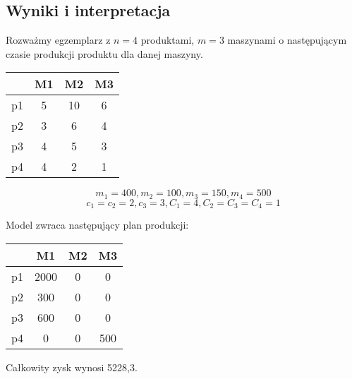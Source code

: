 \documentclass{article}
\begin{document}
\subsection{Wyniki i interpretacja}
Rozważmy egzemplarz z \(n = 4\) produktami, \(m = 3\) maszynami o następującym czasie produkcji produktu dla danej maszyny.

\begin{center}
\begin{tabular}{| c | c c c |}
\hline
 & M1 & M2 & M3\\
\hline
p1 & 5 & 10 & 6\\
p2 & 3 & 6 & 4 \\
p3 & 4 & 5 & 3 \\
p4 & 4 & 2 & 1 \\
\hline
\end{tabular}
\end{center}

\[m_1 = 400, m_2 = 100, m_3 = 150, m_4 = 500\]
\[c_1 =c_2 = 2, c_3 = 3, C_1=4, C_2= C_3=C_4= 1\]

Model zwraca następujący plan produkcji:
\begin{center}
\begin{tabular}{| c | c c c |}
\hline
 & M1 & M2 & M3\\
\hline
p1 & 2000 & 0 & 0\\
p2 & 300 & 0 & 0 \\
p3 & 600 & 0 & 0 \\
p4 & 0 & 0 & 500 \\
\hline
\end{tabular}
\end{center}
Całkowity zysk wynosi 5228,3.
\end{document}
